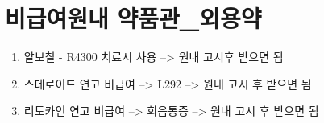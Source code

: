 \section{비급여원내 약품관\_외용약}
\begin{enumerate}\tightlist
\item 알보칠 - R4300  치료시 사용 --> 원내 고시후 받으면 됨
\item 스테로이드 연고 비급여 --> L292 --> 원내 고시 후 받으면 됨
\item 리도카인 연고 비급여 --> 회음통증 --> 원내 고시 후 받으면 됨
\end{enumerate}